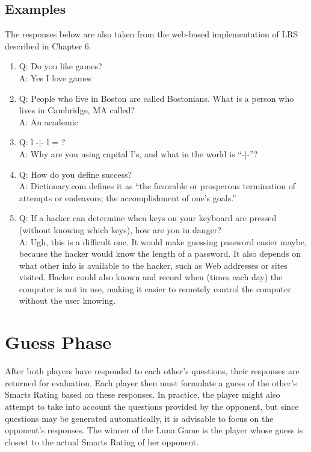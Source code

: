 \subsection{Examples}

The responses below are also taken from the web-based implementation of LRS described in Chapter $6$.

\begin{enumerate}
\item Q: Do you like games? \\
A: Yes I love games
\item Q: People who live in Boston are called Bostonians. What is a person who lives in Cambridge, MA called?\\
A: An academic
\item Q: l -|- l = ?\\
A: Why are you using capital I's, and what in the world is ``-|-''?
\item Q: How do you define success?\\
A: Dictionary.com defines it as ``the favorable or prosperous termination of attempts or endeavors; the accomplishment of one's goals.''
\item Q: If a hacker can determine when keys on your keyboard are pressed (without knowing which keys), how are you in danger?\\
A: Ugh, this is a difficult one. It would make guessing password easier maybe, because the hacker would know the length of a password. It also depends on what other info is available to the hacker, such as Web addresses or sites visited. Hacker could also known and record when (times each day) the computer is not in use, making it easier to remotely control the computer without the user knowing.
\end{enumerate}

\section{Guess Phase}

After both players have responded to each other's questions, their responses are returned for evaluation. Each player then must formulate a guess of the other's Smarts Rating based on these responses. In practice, the player might also attempt to take into account the questions provided by the opponent, but since questions may be generated automatically, it is advisable to focus on the opponent's responses. The winner of the Luna Game is the player whose guess is closest to the actual Smarts Rating of her opponent.

